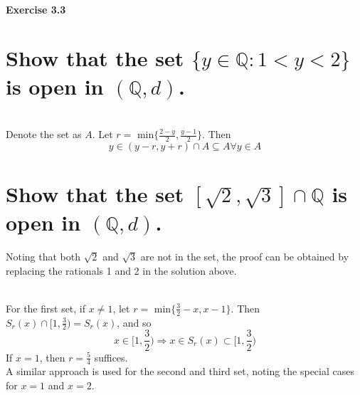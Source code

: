 \subsection{Exercise 3.3}


\begin{parts}
 
 \part{Show that the set $\{y \in \mathbb{Q}:1 < y < 2\}$ is open in $(\mathbb{Q},d)$.}
 
 
\begin{solution}
 \\Denote the set as $A$. Let $r =$ min$\{\frac{2-y}{2},\frac{y-1}{2}\}$. Then
 $$y \in (y-r,y+r) \cap A \subseteq A \forall y \in A$$
\end{solution}

\part{Show that the set $[\sqrt{2},\sqrt{3}]\cap \mathbb{Q}$ is open in $(\mathbb{Q},d)$.}

\begin{solution}
 Noting that both $\sqrt{2}$ and $\sqrt{3}$ are not in the set, the proof can be obtained by replacing the rationals 1 and 2 in the solution above.
\end{solution}
\end{parts}


\begin{solution}
 \\For the first set, if $x \neq 1$, let $r =$ min$\{\frac{3}{2}-x,x-1\}$. Then $S_r(x) \cap [1,\frac{3}{2}) = S_r(x)$, and so
 $$x \in [1,\frac{3}{2}) \Rightarrow x \in S_r(x) \subset [1,\frac{3}{2})$$
 If $x = 1$, then $r = \frac{5}{4}$ suffices. \\
 A similar approach is used for the second and third set, noting the special cases for $x=1$ and $x=2$.
\end{solution}


